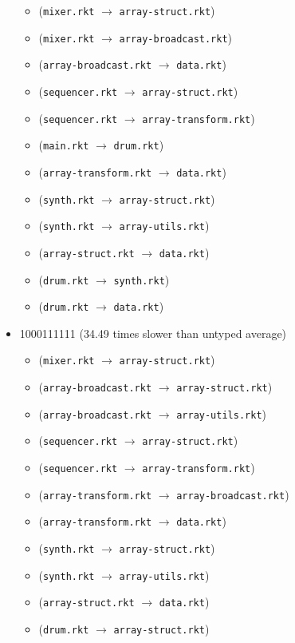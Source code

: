 \documentclass{article}
\newcommand{\mono}[1]{\texttt{#1}}
\begin{document}
\begin{itemize}
\begin{itemize}
  \item (\mono{mixer.rkt} $\rightarrow$ \mono{array-struct.rkt})
  \item (\mono{mixer.rkt} $\rightarrow$ \mono{array-broadcast.rkt})
  \item (\mono{array-broadcast.rkt} $\rightarrow$ \mono{data.rkt})
  \item (\mono{sequencer.rkt} $\rightarrow$ \mono{array-struct.rkt})
  \item (\mono{sequencer.rkt} $\rightarrow$ \mono{array-transform.rkt})
  \item (\mono{main.rkt} $\rightarrow$ \mono{drum.rkt})
  \item (\mono{array-transform.rkt} $\rightarrow$ \mono{data.rkt})
  \item (\mono{synth.rkt} $\rightarrow$ \mono{array-struct.rkt})
  \item (\mono{synth.rkt} $\rightarrow$ \mono{array-utils.rkt})
  \item (\mono{array-struct.rkt} $\rightarrow$ \mono{data.rkt})
  \item (\mono{drum.rkt} $\rightarrow$ \mono{synth.rkt})
  \item (\mono{drum.rkt} $\rightarrow$ \mono{data.rkt})
  \end{itemize}
\item 1000111111 (34.49 times slower than untyped average)
  \begin{itemize}
  \item (\mono{mixer.rkt} $\rightarrow$ \mono{array-struct.rkt})
  \item (\mono{array-broadcast.rkt} $\rightarrow$ \mono{array-struct.rkt})
  \item (\mono{array-broadcast.rkt} $\rightarrow$ \mono{array-utils.rkt})
  \item (\mono{sequencer.rkt} $\rightarrow$ \mono{array-struct.rkt})
  \item (\mono{sequencer.rkt} $\rightarrow$ \mono{array-transform.rkt})
  \item (\mono{array-transform.rkt} $\rightarrow$ \mono{array-broadcast.rkt})
  \item (\mono{array-transform.rkt} $\rightarrow$ \mono{data.rkt})
  \item (\mono{synth.rkt} $\rightarrow$ \mono{array-struct.rkt})
  \item (\mono{synth.rkt} $\rightarrow$ \mono{array-utils.rkt})
  \item (\mono{array-struct.rkt} $\rightarrow$ \mono{data.rkt})
  \item (\mono{drum.rkt} $\rightarrow$ \mono{array-struct.rkt})

\end{itemize}
\end{itemize}
\end{document}
